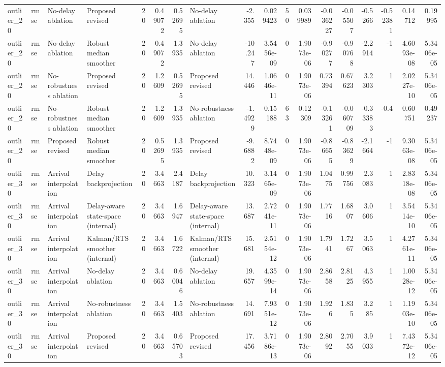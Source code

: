 \begin{table}[!htbp]
{\begin{tabular}{llllrrrlrrrrrrrrrr}
outlier_20 & rmse & No-delay ablation & Proposed revised & 20 & 0.49072 & 0.52695 & No-delay ablation & -2.355 & 0.029423 & 50 & 0.039989 & -0.036227 & -0.05507 & -0.5266 & -0.52381 & 0.14712 & 0.19995 \\
outlier_20 & rmse & No-delay ablation & Robust median smoother & 20 & 0.49072 & 1.3935 & No-delay ablation & -10.247 & 3.5456e-09 & 0 & 1.9073e-06 & -0.90277 & -0.90768 & -2.2914 & -1 & 4.6093e-08 & 5.3406e-05 \\
outlier_20 & rmse & No-robustness ablation & Proposed revised & 20 & 1.2609 & 0.52695 & Proposed revised & 14.446 & 1.0646e-11 & 0 & 1.9073e-06 & 0.73394 & 0.67623 & 3.2303 & 1 & 2.0227e-10 & 5.3406e-05 \\
outlier_20 & rmse & No-robustness ablation & Robust median smoother & 20 & 1.2609 & 1.3935 & No-robustness ablation & -1.4929 & 0.15188 & 63 & 0.12309 & -0.13261 & -0.060709 & -0.33383 & -0.4 & 0.60751 & 0.49237 \\
outlier_20 & rmse & Proposed revised & Robust median smoother & 20 & 0.52695 & 1.3935 & Proposed revised & -9.6882 & 8.7448e-09 & 0 & 1.9073e-06 & -0.86655 & -0.83629 & -2.1664 & -1 & 9.3063e-08 & 5.3406e-05 \\
outlier_30 & rmse & Arrival interpolation & Delay backprojection & 20 & 3.4663 & 2.4187 & Delay backprojection & 10.323 & 3.1465e-09 & 0 & 1.9073e-06 & 1.0475 & 0.99756 & 2.3083 & 1 & 2.8318e-08 & 5.3406e-05 \\
outlier_30 & rmse & Arrival interpolation & Delay-aware state-space (internal) & 20 & 3.4663 & 1.6947 & Delay-aware state-space (internal) & 13.687 & 2.7241e-11 & 0 & 1.9073e-06 & 1.7716 & 1.6807 & 3.0606 & 1 & 3.5414e-10 & 5.3406e-05 \\
outlier_30 & rmse & Arrival interpolation & Kalman/RTS smoother (internal) & 20 & 3.4663 & 1.6722 & Kalman/RTS smoother (internal) & 15.681 & 2.5154e-12 & 0 & 1.9073e-06 & 1.7941 & 1.7267 & 3.5063 & 1 & 4.2761e-11 & 5.3406e-05 \\
outlier_30 & rmse & Arrival interpolation & No-delay ablation & 20 & 3.4663 & 0.60046 & No-delay ablation & 19.657 & 4.3599e-14 & 0 & 1.9073e-06 & 2.8658 & 2.8125 & 4.3955 & 1 & 1.0028e-12 & 5.3406e-05 \\
outlier_30 & rmse & Arrival interpolation & No-robustness ablation & 20 & 3.4663 & 1.5403 & No-robustness ablation & 14.691 & 7.9351e-12 & 0 & 1.9073e-06 & 1.926 & 1.835 & 3.285 & 1 & 1.1903e-10 & 5.3406e-05 \\
outlier_30 & rmse & Arrival interpolation & Proposed revised & 20 & 3.4663 & 0.65703 & Proposed revised & 17.456 & 3.7186e-13 & 0 & 1.9073e-06 & 2.8092 & 2.7055 & 3.9033 & 1 & 7.4372e-12 & 5.3406e-05 \\

\end{tabular}}
\end{table}
